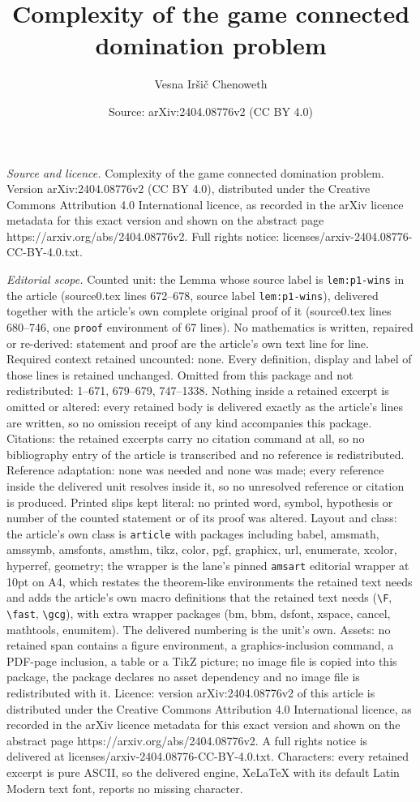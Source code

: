 \documentclass[10pt,a4paper]{amsart}
\title[Complexity of the game connected domination problem]{Complexity of the game connected domination problem}
\author{Vesna Ir\v{s}i\v{c} Chenoweth}
\date{Source: arXiv:2404.08776v2 (CC BY 4.0)}
\begin{document}
\maketitle

\noindent\emph{Source and licence.} Complexity of the game connected domination problem. Version arXiv:2404.08776v2 (CC BY 4.0), distributed under the Creative Commons Attribution 4.0 International licence, as recorded in the arXiv licence metadata for this exact version and shown on the abstract page https://arxiv.org/abs/2404.08776v2. Full rights notice: licenses/arxiv-2404.08776-CC-BY-4.0.txt.\par\smallskip

\noindent\textit{Editorial scope.} Counted unit: the Lemma whose source label is \texttt{lem:p1-wins} in the article (source0.tex lines 672--678, source label \texttt{lem:p1-wins}), delivered together with the article's own complete original proof of it (source0.tex lines 680--746, one \texttt{proof} environment of 67 lines). No mathematics is written, repaired or re-derived: statement and proof are the article's own text line for line. Required context retained uncounted: none. Every definition, display and label of those lines is retained unchanged. Omitted from this package and not redistributed: 1--671, 679--679, 747--1338. Nothing inside a retained excerpt is omitted or altered: every retained body is delivered exactly as the article's lines are written, so no omission receipt of any kind accompanies this package. Citations: the retained excerpts carry no citation command at all, so no bibliography entry of the article is transcribed and no reference is redistributed. Reference adaptation: none was needed and none was made; every reference inside the delivered unit resolves inside it, so no unresolved reference or citation is produced. Printed slips kept literal: no printed word, symbol, hypothesis or number of the counted statement or of its proof was altered. Layout and class: the article's own class is \texttt{article} with packages including babel, amsmath, amssymb, amsfonts, amsthm, tikz, color, pgf, graphicx, url, enumerate, xcolor, hyperref, geometry; the wrapper is the lane's pinned \texttt{amsart} editorial wrapper at 10pt on A4, which restates the theorem-like environments the retained text needs and adds the article's own macro definitions that the retained text needs (\texttt{\textbackslash F}, \texttt{\textbackslash fast}, \texttt{\textbackslash gcg}), with extra wrapper packages (bm, bbm, dsfont, xspace, cancel, mathtools, enumitem). The delivered numbering is the unit's own. Assets: no retained span contains a figure environment, a graphics-inclusion command, a PDF-page inclusion, a table or a TikZ picture; no image file is copied into this package, the package declares no asset dependency and no image file is redistributed with it. Licence: version arXiv:2404.08776v2 of this article is distributed under the Creative Commons Attribution 4.0 International licence, as recorded in the arXiv licence metadata for this exact version and shown on the abstract page https://arxiv.org/abs/2404.08776v2. A full rights notice is delivered at licenses/arxiv-2404.08776-CC-BY-4.0.txt. Characters: every retained excerpt is pure ASCII, so the delivered engine, XeLaTeX with its default Latin Modern text font, reports no missing character.
\end{document}
